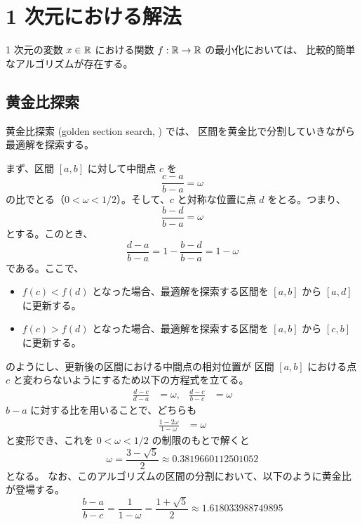 %

\section{1 次元における解法}

1 次元の変数 $x \in \mathbb{R}$ における関数 $f : \mathbb{R} \to \mathbb{R}$ の最小化においては、
比較的簡単なアルゴリズムが存在する。

\subsection{黄金比探索}

黄金比探索 (golden section search, \cite[10.2]{Press2007}) では、
区間を黄金比で分割していきながら最適解を探索する。

まず、区間 $[a,b]$ に対して中間点 $c$ を
\begin{equation}
    \frac{c - a}{b - a} = \omega
\end{equation}
の比でとる（$0 < \omega < 1/2$）。そして、$c$ と対称な位置に点 $d$ をとる。つまり、
\begin{equation}
    \frac{b - d}{b - a} = \omega
\end{equation}
とする。このとき、
\begin{equation}
    \frac{d - a}{b - a} = 1 - \frac{b - d}{b - a} = 1 - \omega
\end{equation}
である。ここで、
\begin{itemize}
    \item $f(c) < f(d)$ となった場合、最適解を探索する区間を $[a, b]$ から $[a, d]$ に更新する。
    \item $f(c) > f(d)$ となった場合、最適解を探索する区間を $[a, b]$ から $[c, b]$ に更新する。
\end{itemize}
のようにし、更新後の区間における中間点の相対位置が
区間 $[a, b]$ における点 $c$ と変わらないようにするため以下の方程式を立てる。
\begin{align}
    \frac{d - c}{d - a} &= \omega, &
    \frac{d - c}{b - c} &= \omega
\end{align}
$b - a$ に対する比を用いることで、どちらも
\begin{align}
    \frac{1 - 2\omega}{1 - \omega} &= \omega
\end{align}
と変形でき、これを $0 < \omega < 1/2$ の制限のもとで解くと
\begin{equation}
    \omega = \frac{3 - \sqrt{5}}{2} \approx 0.3819660112501052
\end{equation}
となる。
なお、このアルゴリズムの区間の分割において、以下のように黄金比が登場する。
\begin{equation}
    \frac{b - a}{b - c} = \frac{1}{1 - \omega} = \frac{1 + \sqrt{5}}{2} \approx 1.618033988749895
\end{equation}
